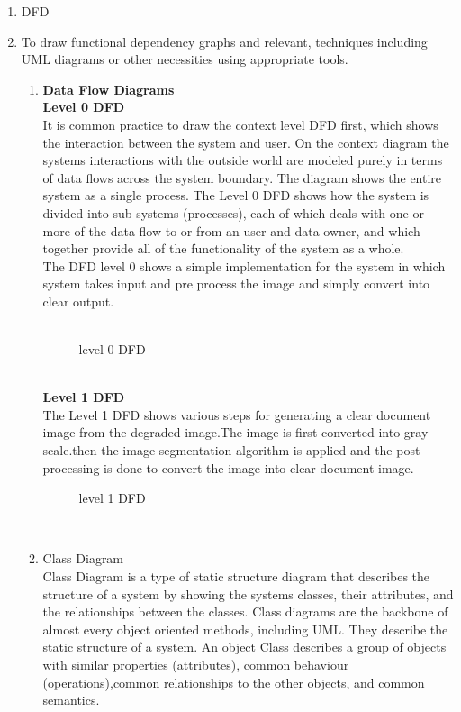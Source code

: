 \begin{enumerate}
\begin{enumerate}
\item DFD
\item To draw functional dependency graphs and relevant, techniques including UML diagrams or other necessities using appropriate tools.
\begin{enumerate}
\item\textbf{Data Flow Diagrams}  \\
\textbf{Level 0 DFD} \\
\hspace*{0.5in}It is common practice to draw the context level DFD first, which shows the interaction between the system and user. On the context diagram the systems interactions with the outside world are modeled purely in terms of data flows across the system boundary. The diagram shows the entire system as a single process. The Level 0 DFD shows how the system is divided into sub-systems (processes), each of which deals with one or more of the data flow to or from an user and data owner, and which together provide all of the functionality of the system as a whole.\\
\hspace*{0.5in} The DFD level 0 shows a simple implementation for the system in which system takes input and pre process the image and simply convert into clear output.\\
\\
\begin{figure}[h]
\centerline{}
\label{atcres}
\caption{level 0 DFD}
\end{figure}
\\
\textbf{Level 1 DFD} \\


\hspace*{0.5in} The Level 1 DFD shows various steps for generating a clear document image from the degraded image.The image is first converted into gray scale.then the image segmentation algorithm is applied and the post processing is done to convert the image into clear document image.\\

\begin{figure}[h]
\centerline{}
\label{atcres}
\caption{level 1 DFD}
\end{figure}
\\

\item Class Diagram\\
\hspace*{0.5in}Class Diagram is a type of static structure diagram that describes the structure of a system by showing the systems classes, their attributes, and the relationships between the classes. Class diagrams are the backbone of almost every object oriented methods, including UML. They describe the static structure of a system. An object Class describes a group of objects with similar properties (attributes), common behaviour (operations),common relationships to the other objects, and common semantics.\\


\end{enumerate}
\end{enumerate}
\end{enumerate}
